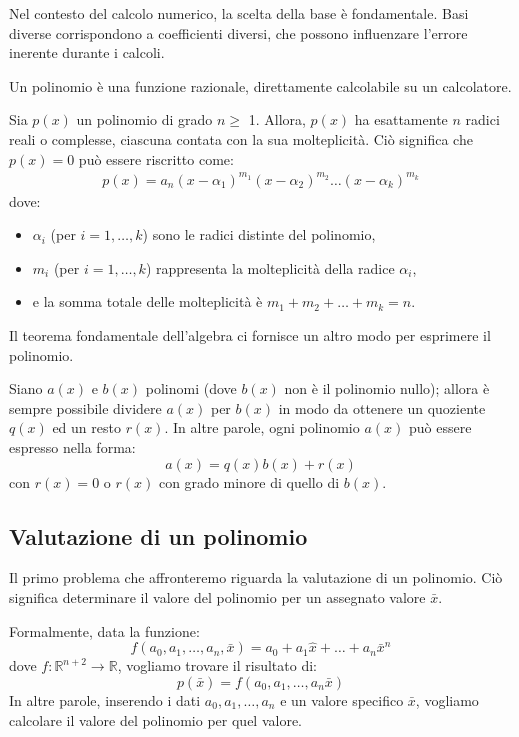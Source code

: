 \documentclass{article}
\begin{document}
Nel contesto del calcolo numerico, la scelta della base è fondamentale. Basi
diverse corrispondono a coefficienti diversi, che possono influenzare l'errore
inerente durante i calcoli.
\begin{oss}
    Un polinomio è una funzione razionale, direttamente calcolabile su un
    calcolatore.
\end{oss}
\begin{theorem}
    Sia $p(x)$ un polinomio di grado $n  \geq$ 1. Allora, $p(x)$ ha 
    esattamente $n$ radici reali o complesse, ciascuna contata con la sua
    molteplicità. Ciò significa che $p(x)=0$ può essere riscritto come:
    \begin{equation}
        \begin{aligned} \label{eq:teorema_divisione_polinomi}
           p(x)=a_n(x-\alpha_1)^{m_1}(x-\alpha_2)^{m_2}\ldots(x-\alpha_k)^{m_k}
       \end{aligned} 
    \end{equation}
    dove:
    \begin{itemize}
        \item $\alpha_i$ (per $i=1,\ldots,k$) sono le radici distinte del polinomio,
       \item $m_i$ (per $i=1,\ldots,k$) rappresenta la molteplicità della radice
       $\alpha_i$,
       \item e la somma totale delle molteplicità è $m_1+m_2+\ldots+m_k=n$.
    \end{itemize}
\end{theorem}
Il teorema fondamentale dell'algebra ci fornisce un altro modo per esprimere
il polinomio.
\begin{theorem}
    Siano $a(x)$ e $b(x)$ polinomi (dove $b(x)$ non è il polinomio nullo); 
    allora è sempre possibile dividere $a(x)$ per $b(x)$ in modo da ottenere
    un quoziente $q(x)$ ed un resto $r(x)$. In altre parole, ogni polinomio
    $a(x)$ può essere espresso nella forma: 
    $$a(x)=q(x)b(x)+r(x)$$
    con $r(x)=0$ o $r(x)$ con grado minore di quello di $b(x)$.
\end{theorem}
\subsection{Valutazione di un polinomio}
Il primo problema che affronteremo riguarda la valutazione di un polinomio.
Ciò significa determinare il valore del polinomio per un assegnato valore $\bar{x}$.

Formalmente, data la funzione:
$$f(a_0,a_1,\ldots,a_n,\bar{x})=a_0+a_1\hat{x}+\ldots+a_n\bar{x}^n$$
dove $f:\mathbb{R}^{n+2}\rightarrow \mathbb{R}$, vogliamo trovare il risultato
di:
$$p(\bar{x})=f(a_0,a_1,\ldots,a_n\bar{x})$$
In altre parole, inserendo i dati $a_0,a_1,\ldots,a_n$ e un valore specifico
$\bar{x}$, vogliamo calcolare il valore del polinomio per quel valore.
\end{document}
